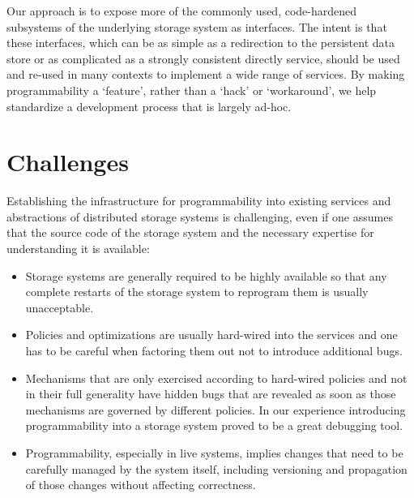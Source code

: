 \documentclass[preprint]{sigplanconf-eurosys}
\begin{document}
Our approach is to expose more of the commonly used, code-hardened subsystems
of the underlying storage system as interfaces. The intent is that these
interfaces, which can be as simple as a redirection to the persistent data
store or as complicated as a strongly consistent directly service, should be
used and re-used in many contexts to implement a wide range of services. By
making programmability a `feature', rather than a `hack' or `workaround', we
help standardize a development process that is largely ad-hoc.

%

\section{Challenges}
\label{sec:challenges}

Establishing the infrastructure for programmability into existing services and
abstractions of distributed storage systems is challenging, even if one assumes
that the source code of the storage system and the necessary expertise for
understanding it is available:

\begin{itemize}
	
\item Storage systems are generally required to be highly available so that any
complete restarts of the storage system to reprogram them is usually
unacceptable. 

\item Policies and optimizations are usually hard-wired into the services and
one has to be careful when factoring them out not to introduce additional bugs. 

\item Mechanisms that are only exercised according to hard-wired policies and
not in their full generality have hidden bugs that are revealed as soon as
those mechanisms are governed by different policies. In our experience
introducing programmability into a storage system proved to be a great
debugging tool.

\item Programmability, especially in live systems, implies changes that need to
be carefully managed by the system itself, including versioning and propagation
of those changes without affecting correctness.

\end{itemize}
\end{document}
